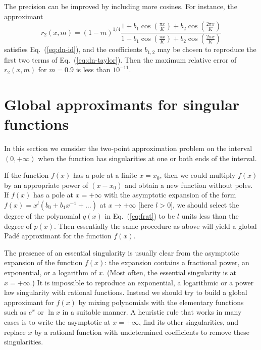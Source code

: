 \documentclass{llncs}
\begin{document}
The precision can be improved by including more cosines. For instance,
the approximant\begin{equation}
r_{2}\left(x,m\right)=\left(1-m\right)^{1/4}\frac{1+b_{1}\cos \left(\frac{\pi x}{K}\right)+b_{2}\cos \left(\frac{2\pi x}{K}\right)}{1-b_{1}\cos \left(\frac{\pi x}{K}\right)+b_{2}\cos \left(\frac{2\pi x}{K}\right)}\end{equation}
 satisfies Eq.~(\ref{eq:dn-id}), and the coefficients $b_{1,2}$
may be chosen to reproduce the first two terms of Eq.~(\ref{eq:dn-taylor}).
Then the maximum relative error of $r_{2}\left(x,m\right)$ for $m=0.9$
is less than $10^{-11}$.


\section{Global approximants for singular functions}

In this section we consider the two-point approximation problem on
the interval $\left(0,+\infty \right)$ when the function has singularities
at one or both ends of the interval.

If the function $f\left(x\right)$ has a pole at a finite $x=x_{0}$,
then we could multiply $f\left(x\right)$ by an appropriate power
of $\left(x-x_{0}\right)$ and obtain a new function without poles.
If $f\left(x\right)$ has a pole at $x=+\infty $ with the asymptotic
expansion of the form $f\left(x\right)=x^{l}\left(b_{0}+b_{1}x^{-1}+...\right)$
at $x\rightarrow +\infty $ {[}here $l>0${]}, we should select the
degree of the polynomial $q\left(x\right)$ in Eq.~(\ref{eq:frat})
to be $l$ units less than the degree of $p\left(x\right)$. Then
essentially the same procedure as above will yield a global Pad\'e approximant
for the function $f\left(x\right)$.

The presence of an essential singularity is usually clear from the
asymptotic expansion of the function $f\left(x\right)$: the expansion
contains a fractional power, an exponential, or a logarithm of $x$.
(Most often, the essential singularity is at $x=+\infty $.) It is
impossible to reproduce an exponential, a logarithmic or a power law
singularity with rational functions. Instead we should try to build
a global approximant for $f\left(x\right)$ by mixing polynomials
with the elementary functions such as $e^{x}$ or $\ln x$ in a suitable
manner. A heuristic rule that works in many cases is to write the
asymptotic at $x=+\infty $, find its other singularities, and replace
$x$ by a rational function with undetermined coefficients to remove
these singularities.
\end{document}
